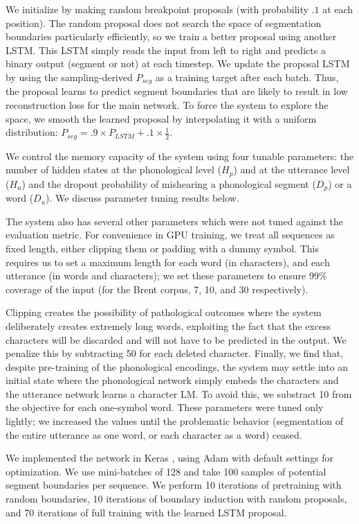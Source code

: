 \documentclass[11pt,letterpaper]{article}
\begin{document}
We initialize by making random breakpoint proposals (with probability
$.1$ at each position). The random proposal does not search the space
of segmentation boundaries particularly efficiently, so we train a
better proposal using another LSTM. This LSTM simply reads the input
from left to right and predicts a binary output (segment or not) at
each timestep. We update the proposal LSTM by using the
sampling-derived $P_{seg}$ as a training target after each
batch. Thus, the proposal learns to predict segment boundaries that
are likely to result in low reconstruction loss for the main
network. To force the system to explore the space, we smooth the
learned proposal by interpolating it with a uniform distribution:
$P_{seg} = .9 \times P_{LSTM} + .1 \times \frac{1}{2}$.

We control the memory capacity of the system using four tunable
parameters: the number of hidden states at the phonological level
($H_p$) and at the utterance level ($H_u$) and the dropout probability
of mishearing a phonological segment ($D_p$) or a word ($D_u$). We
discuss parameter tuning results below.

The system also has several other parameters which were not tuned
against the evaluation metric. For convenience in GPU training, we
treat all sequences as fixed length, either clipping them or padding
with a dummy symbol. This requires us to set a maximum length for each
word (in characters), and each utterance (in words and characters); we
set these parameters to ensure 99\% coverage of the input (for the
Brent corpus, 7, 10, and 30 respectively).

Clipping creates the possibility of pathological outcomes where the
system deliberately creates extremely long words, exploiting the fact
that the excess characters will be discarded and will not have to be
predicted in the output. We penalize this by subtracting 50 for each
deleted character. Finally, we find that, despite pre-training of the
phonological encodings, the system may settle into an initial state
where the phonological network simply embeds the characters and the
utterance network learns a character LM. To avoid this, we substract
10 from the objective for each one-symbol word. These parameters were
tuned only lightly; we increased the values until the problematic
behavior (segmentation of the entire utterance as one word, or each
character as a word) ceased.

We implemented the network in Keras \cite{Keras}, using Adam \cite{xxx}
with default settings for optimization. We use mini-batches of 128 and
take 100 samples of potential segment boundaries per sequence. We
perform 10 iterations of pretraining with random boundaries, 10
iterations of boundary induction with random proposals, and 70
iterations of full training with the learned LSTM proposal.
\end{document}
